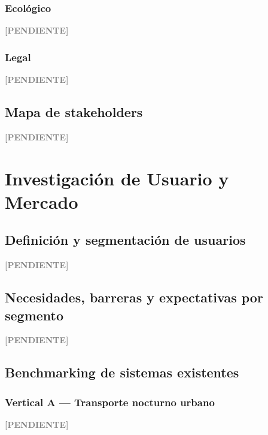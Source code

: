 \documentclass[12pt,a4paper]{article}
\newenvironment{pendiente}
  {\par\vspace{4pt}\noindent\textcolor{gray}{\textbf{[PENDIENTE]}}\par\begingroup\color{gray}\small}
  {\endgroup\par\vspace{4pt}}
\begin{document}
\subsubsection{Ecológico}
\begin{pendiente}
\end{pendiente}

\subsubsection{Legal}
\begin{pendiente}
\end{pendiente}

\subsection{Mapa de stakeholders}
\begin{pendiente}
\end{pendiente}



\section{Investigación de Usuario y Mercado}

\subsection{Definición y segmentación de usuarios}
\begin{pendiente}
\end{pendiente}

\subsection{Necesidades, barreras y expectativas por segmento}
\begin{pendiente}
\end{pendiente}

\subsection{Benchmarking de sistemas existentes}

\subsubsection{Vertical A --- Transporte nocturno urbano}
\begin{pendiente}
\end{pendiente}
\end{document}
